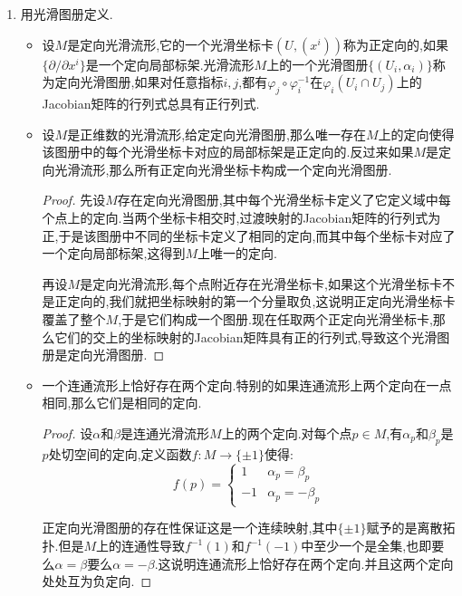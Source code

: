 \begin{enumerate}
\begin{itemize}
\begin{proof}
    		如果$M$是$n$维定向光滑流形,【单位分解】
    	\end{proof}
        \item 按照这个性质,我们把$n$维光滑流形$M$上处处非零的$n$形式称为定向形式.如果$M$是$n$维定向流形,诱导出这个定向的定向形式称为正定向形式.那么如果$\widetilde{\omega}$和$\omega$都是定向流形$M$上的正定向形式,就存在严格恒为正的光滑函数$f$使得$\widetilde{\omega}=f\omega$.
    \end{itemize}
    \item 用光滑图册定义.
    \begin{itemize}
    	\item 设$M$是定向光滑流形,它的一个光滑坐标卡$(U,(x^i))$称为正定向的,如果$\{\partial/\partial x^i\}$是一个定向局部标架.光滑流形$M$上的一个光滑图册$\{(U_i,\alpha_i)\}$称为定向光滑图册,如果对任意指标$i,j$,都有$\varphi_j\circ\varphi_i^{-1}$在$\varphi_i(U_i\cap U_j)$上的Jacobian矩阵的行列式总具有正行列式.
    	\item 设$M$是正维数的光滑流形,给定定向光滑图册,那么唯一存在$M$上的定向使得该图册中的每个光滑坐标卡对应的局部标架是正定向的.反过来如果$M$是定向光滑流形,那么所有正定向光滑坐标卡构成一个定向光滑图册.
    	\begin{proof}
    		
    		先设$M$存在定向光滑图册,其中每个光滑坐标卡定义了它定义域中每个点上的定向.当两个坐标卡相交时,过渡映射的Jacobian矩阵的行列式为正,于是该图册中不同的坐标卡定义了相同的定向,而其中每个坐标卡对应了一个定向局部标架,这得到$M$上唯一的定向.
    		
    		再设$M$是定向光滑流形,每个点附近存在光滑坐标卡,如果这个光滑坐标卡不是正定向的,我们就把坐标映射的第一个分量取负,这说明正定向光滑坐标卡覆盖了整个$M$,于是它们构成一个图册.现在任取两个正定向光滑坐标卡,那么它们的交上的坐标映射的Jacobian矩阵具有正的行列式,导致这个光滑图册是定向光滑图册.
    	\end{proof}
        \item 一个连通流形上恰好存在两个定向.特别的如果连通流形上两个定向在一点相同,那么它们是相同的定向.
        \begin{proof}
        	
        	设$\alpha$和$\beta$是连通光滑流形$M$上的两个定向.对每个点$p\in M$,有$\alpha_p$和$\beta_p$是$p$处切空间的定向,定义函数$f:M\to\{\pm1\}$使得:
        	$$f(p)=\left\{\begin{array}{cc}1&\alpha_p=\beta_p\\-1&\alpha_p=-\beta_p\end{array}\right.$$
        	
        	正定向光滑图册的存在性保证这是一个连续映射,其中$\{\pm1\}$赋予的是离散拓扑.但是$M$上的连通性导致$f^{-1}(1)$和$f^{-1}(-1)$中至少一个是全集,也即要么$\alpha=\beta$要么$\alpha=-\beta$.这说明连通流形上恰好存在两个定向.并且这两个定向处处互为负定向.
        \end{proof}
    \end{itemize}
\end{enumerate}

